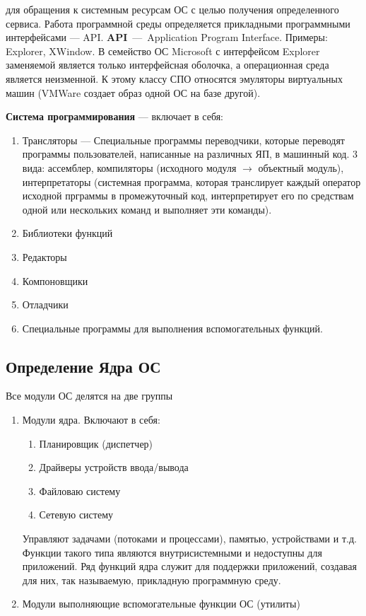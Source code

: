 для обращения к системным ресурсам ОС с целью получения определенного сервиса.
Работа программной среды определяется прикладными программными интерфейсами ---
API. \textbf{API}~---~Application Program Interface. Примеры: Explorer, XWindow.
В семейство ОС Microsoft с интерфейсом Explorer заменяемой является только
интерфейсная оболочка, а операционная среда является неизменной. К этому классу
СПО относятся эмуляторы виртуальных машин (VMWare создает образ одной ОС на базе
другой).\par
\textbf{Система программирования} --- включает в себя:
\begin{enumerate}
	\item Трансляторы --- Специальные программы переводчики, которые переводят
		программы пользователей, написанные на различных ЯП, в машинный код. 3 вида:
		ассемблер, компиляторы (исходного модуля $\rightarrow$ объектный модуль), 
		интерпретаторы (системная программа, которая транслирует каждый оператор
		исходной прграммы в промежуточный код, интерпретирует его по средствам одной
		или нескольких команд и выполняет эти команды). 
	\item Библиотеки функций
	\item Редакторы
	\item Компоновщики
	\item Отладчики
	\item Специальные программы для выполнения вспомогательных функций.
\end{enumerate}
\subsection{Определение Ядра ОС}
Все модули ОС делятся на две группы
\begin{enumerate}
	\item Модули ядра. Включают в себя:
		\begin{enumerate}
			\item Планировщик (диспетчер)
			\item Драйверы устройств ввода/вывода
			\item Файловаю систему
			\item Сетевую систему
		\end{enumerate}
		Управляют задачами (потоками и процессами), памятью, устройствами и т.д.
		Функции такого типа являются внутрисистемными и недоступны для приложений.
		Ряд функций ядра служит для поддержки приложений, создавая для них, так
		называемую, прикладную программную среду.
	\item Модули выполняющие вспомогательные функции ОС (утилиты)
\end{enumerate}

